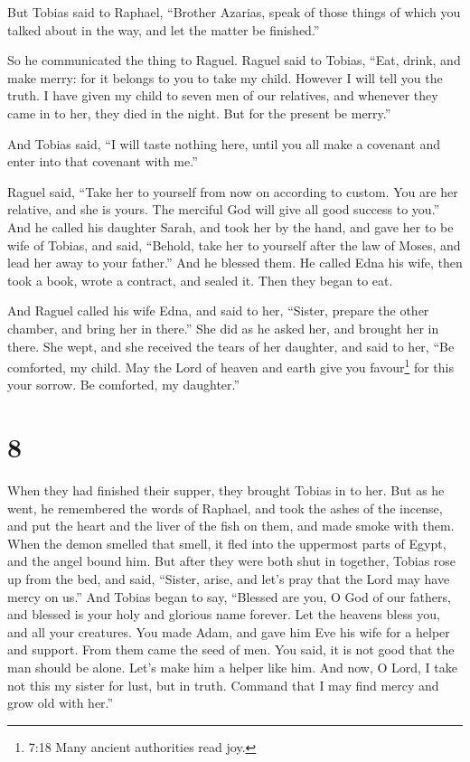 But Tobias said to Raphael, ``Brother Azarias, speak of those things of
which you talked about in the way, and let the matter be finished.''

 So he communicated the thing to Raguel. Raguel said to
Tobias, ``Eat, drink, and make merry:  for it belongs to
you to take my child. However I will tell you the truth.  I
have given my child to seven men of our relatives, and whenever they
came in to her, they died in the night. But for the present be merry.''

And Tobias said, ``I will taste nothing here, until you all make a
covenant and enter into that covenant with me.''

 Raguel said, ``Take her to yourself from now on according
to custom. You are her relative, and she is yours. The merciful God will
give all good success to you.''  And he called his daughter
Sarah, and took her by the hand, and gave her to be wife of Tobias, and
said, ``Behold, take her to yourself after the law of Moses, and lead
her away to your father.'' And he blessed them.  He called
Edna his wife, then took a book, wrote a contract, and sealed it.
 Then they began to eat.

 And Raguel called his wife Edna, and said to her,
``Sister, prepare the other chamber, and bring her in there.''
 She did as he asked her, and brought her in there. She
wept, and she received the tears of her daughter, and said to her,
 ``Be comforted, my child. May the Lord of heaven and earth
give you favour\footnote{7:18 Many ancient authorities read joy.} for
this your sorrow. Be comforted, my daughter.''

\hypertarget{section-7}{%
\section{8}\label{section-7}}

 When they had finished their supper, they brought Tobias in
to her.  But as he went, he remembered the words of Raphael,
and took the ashes of the incense, and put the heart and the liver of
the fish on them, and made smoke with them.  When the demon
smelled that smell, it fled into the uppermost parts of Egypt, and the
angel bound him.  But after they were both shut in together,
Tobias rose up from the bed, and said, ``Sister, arise, and let's pray
that the Lord may have mercy on us.''  And Tobias began to
say, ``Blessed are you, O God of our fathers, and blessed is your holy
and glorious name forever. Let the heavens bless you, and all your
creatures.  You made Adam, and gave him Eve his wife for a
helper and support. From them came the seed of men. You said, it is not
good that the man should be alone. Let's make him a helper like him.
 And now, O Lord, I take not this my sister for lust, but in
truth. Command that I may find mercy and grow old with her.''

